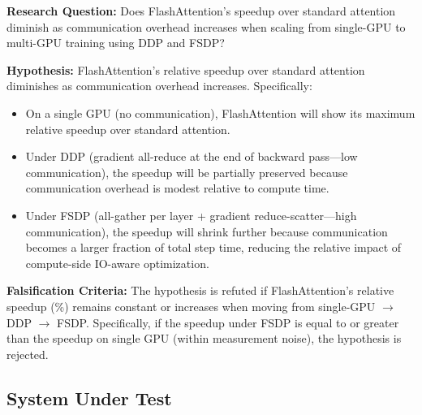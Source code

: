 \documentclass[12pt, a4paper]{article}
\begin{document}
\vspace{1em}
\textbf{Research Question:} Does FlashAttention's speedup over standard attention diminish as communication overhead increases when scaling from single-GPU to multi-GPU training using DDP and FSDP?

\vspace{1em}
\textbf{Hypothesis:} FlashAttention's relative speedup over standard attention diminishes as communication overhead increases. Specifically:
\begin{itemize}
    \item On a single GPU (no communication), FlashAttention will show its maximum relative speedup over standard attention.
    \item Under DDP (gradient all-reduce at the end of backward pass---low communication), the speedup will be partially preserved because communication overhead is modest relative to compute time.
    \item Under FSDP (all-gather per layer + gradient reduce-scatter---high communication), the speedup will shrink further because communication becomes a larger fraction of total step time, reducing the relative impact of compute-side IO-aware optimization.
\end{itemize}

\vspace{1em}
\textbf{Falsification Criteria:} The hypothesis is refuted if FlashAttention's relative speedup (\%) remains constant or increases when moving from single-GPU $\rightarrow$ DDP $\rightarrow$ FSDP. Specifically, if the speedup under FSDP is equal to or greater than the speedup on single GPU (within measurement noise), the hypothesis is rejected.

\subsection{System Under Test}
\end{document}
